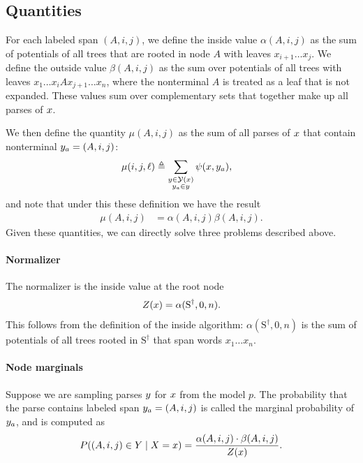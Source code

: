 \subsection{Quantities}
For each labeled span $(A, i, j)$, we define the inside value $\alpha(A, i, j)$ as the sum of potentials of all trees that are rooted in node $A$ with leaves $x_{i+1} \dots x_j$. We define the outside value $\beta(A, i, j)$ as the sum over potentials of all trees with leaves $x_1 \dots x_i A x_{j+1} \dots x_n$, where the nonterminal $A$ is treated as a leaf that is not expanded. These values sum over complementary sets that together make up all parses of $x$.


We then define the quantity $\mu(A, i, j)$ as the sum of all parses of $x$ that contain nonterminal $y_a = (A, i, j)$:
\begin{align*}
  \mu(i, j, \ell)
    &\triangleq \sum_{ \substack{ y \in \mathcal{Y}(x) \\ y_a \in y } } \psi(x, y_a),
\end{align*}
and note that under this these definition we have the result
\begin{align}
  \mu(A, i, j) &= \alpha(A, i, j) \beta(A, i, j).
\end{align}
Given these quantities, we can directly solve three problems described above.

\paragraph{Normalizer}
The normalizer is the inside value at the root node
\begin{align}
  Z(x) = \alpha(\text{S}^{\dagger}, 0, n).
\end{align}
This follows from the definition of the inside algorithm: $\alpha(\text{S}^{\dagger}, 0, n)$ is the sum of potentials of all trees rooted in $\text{S}^{\dagger}$ that span words $x_1 \dots x_n$.

\paragraph{Node marginals}
Suppose we are sampling parses $y$ for $x$ from the model $p$. The probability that the parse contains labeled span $y_a = (A, i, j)$ is called the marginal probability of $y_a$, and is computed as
\begin{align}
  P( (A, i, j) \in Y \mid X = x ) = \frac{\alpha(A, i, j) \cdot \beta(A, i, j)}{Z(x)}.
\end{align}

